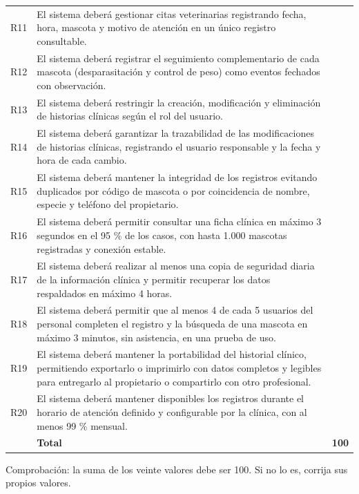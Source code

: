\documentclass[11pt,a4paper]{article}
\begin{document}
\begin{longtable}{@{}lp{13.5cm}r@{}}
R11 & El sistema deberá gestionar citas veterinarias registrando fecha, hora, mascota y motivo de atención en un único registro consultable. & \\
R12 & El sistema deberá registrar el seguimiento complementario de cada mascota (desparasitación y control de peso) como eventos fechados con observación. & \\
R13 & El sistema deberá restringir la creación, modificación y eliminación de historias clínicas según el rol del usuario. & \\
R14 & El sistema deberá garantizar la trazabilidad de las modificaciones de historias clínicas, registrando el usuario responsable y la fecha y hora de cada cambio. & \\
R15 & El sistema deberá mantener la integridad de los registros evitando duplicados por código de mascota o por coincidencia de nombre, especie y teléfono del propietario. & \\
R16 & El sistema deberá permitir consultar una ficha clínica en máximo 3 segundos en el 95 \% de los casos, con hasta 1.000 mascotas registradas y conexión estable. & \\
R17 & El sistema deberá realizar al menos una copia de seguridad diaria de la información clínica y permitir recuperar los datos respaldados en máximo 4 horas. & \\
R18 & El sistema deberá permitir que al menos 4 de cada 5 usuarios del personal completen el registro y la búsqueda de una mascota en máximo 3 minutos, sin asistencia, en una prueba de uso. & \\
R19 & El sistema deberá mantener la portabilidad del historial clínico, permitiendo exportarlo o imprimirlo con datos completos y legibles para entregarlo al propietario o compartirlo con otro profesional. & \\
R20 & El sistema deberá mantener disponibles los registros durante el horario de atención definido y configurable por la clínica, con al menos 99 \% mensual. & \\
\midrule
 & \textbf{Total} & \textbf{100} \\
\bottomrule
\end{longtable}

\noindent Comprobaci\'{o}n: la suma de los veinte valores debe ser 100. Si no lo es, corrija sus propios valores.
\end{document}
